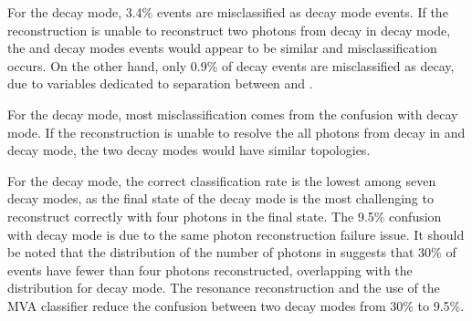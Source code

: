 
For the \decayPionShort decay mode, 3.4\% events are misclassified as \decayRhoShortest decay mode events. If the reconstruction is unable to reconstruct two photons from \Ppizero decay in \decayRhoShortest decay mode, the \decayPionShort and \decayRhoShortest decay modes events would appear to be similar and misclassification occurs. On the other hand, only 0.9\% of \decayPionShort decay events are misclassified as \decayElectronShort decay, due to variables dedicated to separation between \Pem and \Ppiminus.



For the \decayRhoShortest decay mode, most misclassification comes from the confusion with \decayAiPhotonShortest decay mode.  If the reconstruction is unable to resolve the all photons from \Ppizero decay in \decayRhoShortest and \decayAiPhotonShortest decay mode, the two decay modes would have similar topologies.

For the \decayAiPhotonShortest decay mode, the correct classification rate is the lowest among seven decay modes, as the final state of the \decayAiPhotonShortest decay mode is the most challenging to reconstruct correctly with four photons in the final state. The 9.5\% confusion with \decayRhoShortest decay mode is due to the same photon reconstruction failure issue. It should be noted that the distribution of the number of photons in  suggests that 30\% of \decayAiPhotonShortest events have fewer than four photons reconstructed, overlapping with the distribution for \decayRhoShortest decay mode. The \decayAiPhotonShortest resonance reconstruction and the use of the MVA \multiclass classifier reduce the confusion between two decay modes from 30\% to  9.5\%.


